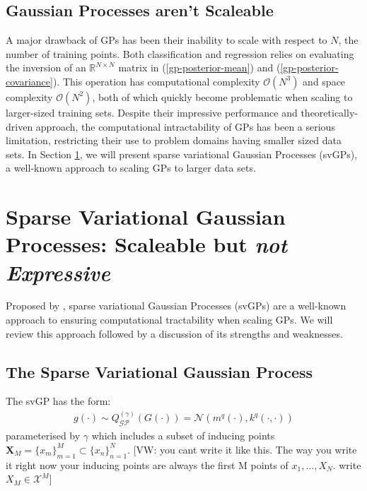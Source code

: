 \documentclass{article}
\newcommand{\vw}[1]{{\color{green} [VW: #1]}}
\newcommand{\GP}{\operatorname{\mathcal{GP}}}
\numberwithin{equation}{section}
\begin{document}
\subsection{Gaussian Processes aren't Scaleable}\label{section:gp-problems}
A major drawback of GPs has been their inability to scale with respect to $N$, the number of training points. Both classification and regression relies on evaluating the inversion of an $\mathbb{R}^{N \times N}$ matrix in (\ref{gp-posterior-mean}) and (\ref{gp-posterior-covariance}). This operation has computational complexity $\mathcal{O}(N^3)$ and space complexity $\mathcal{O}(N^2)$, both of which quickly become problematic when scaling to larger-sized training sets. Despite their impressive performance and theoretically-driven approach, the computational intractability of GPs has been a serious limitation, restricting their use to problem domains having smaller sized data sets. In Section \ref{section:the-svgp}, we will present sparse variational Gaussian Processes (svGPs), a well-known approach to scaling GPs to larger data sets.

\newpage
\section{Sparse Variational Gaussian Processes: Scaleable but \textit{not Expressive}}\label{section:the-svgp}
Proposed by \cite{titsias2009variational}, sparse variational Gaussian Processes (svGPs) are a well-known approach to ensuring computational tractability when scaling GPs. We will review this approach followed by a discussion of its strengths and weaknesses.




\subsection{The Sparse Variational Gaussian Process}



The svGP has the form:
\begin{align}
g(\cdot) \sim Q^{(\gamma)}_{\GP}(G(\cdot)) = \mathcal{N}\left(m^{q}(\cdot), k^{q}(\cdot, \cdot)\right)
\label{svgp}
\end{align}
parameterised by $\gamma$ which includes a subset of inducing points $\mathbf{X}_M = \{x_m\}_{m=1}^{M} \subset \{x_n\}_{n=1}^{N}$. \vw{you cant write it like this. The way you write it right now your inducing points are always the first M points of $x_1,\hdots,X_N$. write $X_M \in \mathcal{X}^M$}
\end{document}
